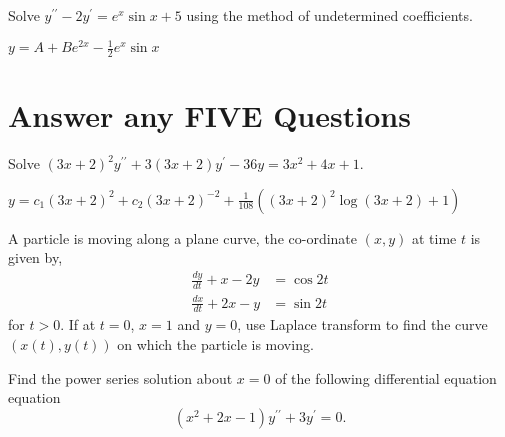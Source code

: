 \documentclass[a4paper,12pt]{vitexam}
\begin{document}
\begin{questions}
     

\question[10] 
Solve $y^{\prime\prime} - 2y^\prime = e^x \sin x + 5$ using the method of undetermined coefficients.

\begin{solution}
$y = A + B e^{2x} - \frac 1 2 e^x \sin x$
\end{solution} 

\part{Answer any FIVE  Questions}

     

\question[10]  Solve $(3x+2)^2 y ^{\prime \prime } + 3 ( 3x + 2) y^\prime -36 y = 3x^2 + 4x +1. $
\begin{solution}
	$ y = c_1 (3x+2)^2 + c_2 (3x + 2)^{-2} + \frac 1 {108} \left( (3x+2)^2 \log (3x+2) +1 \right)$
\end{solution}





     

\question[10] A particle is moving along a plane curve,  the co-ordinate $(x,y)$ at time $t$ is given by,
\begin{align*}
	\frac{dy}{dt} + x - 2y  & = \cos 2t \\
	\frac{dx}{dt} + 2x - y & = \sin 2t			 
\end{align*}
for $t > 0$. If at $t = 0$, $x =1$ and $y = 0$, use Laplace transform to find the curve $(x(t),y(t))$ on which the particle is moving. 




     

\question[10] Find the power series solution about $x=0$ of the following differential equation equation $$(x^2 + 2x -1)y^{\prime\prime} + 3y^{\prime}= 0.$$

     

\question
{}
\end{questions}
\end{document}

